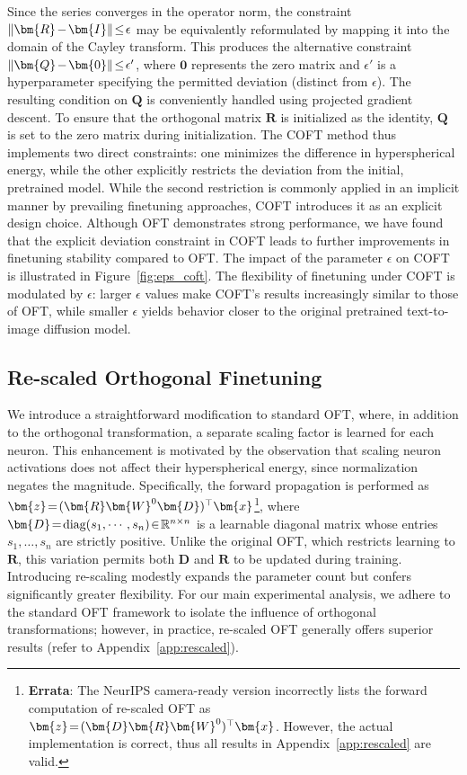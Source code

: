 Since the series converges in the operator norm, the constraint $\thickmuskip=2mu \medmuskip=2mu\|\bm{R}-\bm{I}\|\leq\epsilon$ may be equivalently reformulated by mapping it into the domain of the Cayley transform. This produces the alternative constraint $\thickmuskip=2mu \medmuskip=2mu \|\bm{Q}-\bm{0}\|\leq\epsilon'$, where $\bm{0}$ represents the zero matrix and $\epsilon'$ is a hyperparameter specifying the permitted deviation (distinct from $\epsilon$). The resulting condition on $\bm{Q}$ is conveniently handled using projected gradient descent. To ensure that the orthogonal matrix $\bm{R}$ is initialized as the identity, $\bm{Q}$ is set to the zero matrix during initialization. The COFT method thus implements two direct constraints: one minimizes the difference in hyperspherical energy, while the other explicitly restricts the deviation from the initial, pretrained model. While the second restriction is commonly applied in an implicit manner by prevailing finetuning approaches, COFT introduces it as an explicit design choice. Although OFT demonstrates strong performance, we have found that the explicit deviation constraint in COFT leads to further improvements in finetuning stability compared to OFT. The impact of the parameter $\epsilon$ on COFT is illustrated in Figure~\ref{fig:eps_coft}. The flexibility of finetuning under COFT is modulated by $\epsilon$: larger $\epsilon$ values make COFT’s results increasingly similar to those of OFT, while smaller $\epsilon$ yields behavior closer to the original pretrained text-to-image diffusion model.

\subsection{Re-scaled Orthogonal Finetuning}

We introduce a straightforward modification to standard OFT, where, in addition to the orthogonal transformation, a separate scaling factor is learned for each neuron. This enhancement is motivated by the observation that scaling neuron activations does not affect their hyperspherical energy, since normalization negates the magnitude. Specifically, the forward propagation is performed as $\thickmuskip=2mu \medmuskip=2mu\bm{z}=(\bm{R}\bm{W}^0\bm{D})^\top\bm{x}$\footnote{\textbf{Errata}: The NeurIPS camera-ready version incorrectly lists the forward computation of re-scaled OFT as $\thickmuskip=2mu \medmuskip=2mu\bm{z}=(\bm{D}\bm{R}\bm{W}^0)^\top\bm{x}$. However, the actual implementation is correct, thus all results in Appendix~\ref{app:rescaled} are valid.}, where $\thickmuskip=2mu \medmuskip=2mu \bm{D}=\text{diag}(s_1,\cdots,s_n)\in\mathbb{R}^{n\times n}$ is a learnable diagonal matrix whose entries $s_1,\ldots,s_n$ are strictly positive. Unlike the original OFT, which restricts learning to $\bm{R}$, this variation permits both $\bm{D}$ and $\bm{R}$ to be updated during training. Introducing re-scaling modestly expands the parameter count but confers significantly greater flexibility. For our main experimental analysis, we adhere to the standard OFT framework to isolate the influence of orthogonal transformations; however, in practice, re-scaled OFT generally offers superior results (refer to Appendix~\ref{app:rescaled}).

